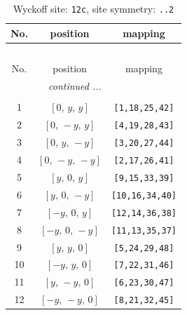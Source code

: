 \documentclass[fleqn,8pt]{jsarticle}
\begin{document}
\begin{longtable}{ccc}
\caption{Wyckoff site: {\tt 12c}, site symmetry: {\tt ..2}}
 \\
 \hline \hline
No. & position & mapping \\ \hline \endfirsthead

\multicolumn{2}{l}{\tablename\ \thetable{}} \\
 \hline \hline
No. & position & mapping \\ \hline \endhead

 \hline \hline
\multicolumn{2}{r}{\footnotesize\it continued ...} \\ \endfoot

 \hline \hline
\multicolumn{2}{r}{} \\ \endlastfoot

1 & $\left[ 0,\, y,\, y \right]$ & {\tt [1,18,25,42]} \\ \hline
2 & $\left[ 0,\, - y,\, y \right]$ & {\tt [4,19,28,43]} \\ \hline
3 & $\left[ 0,\, y,\, - y \right]$ & {\tt [3,20,27,44]} \\ \hline
4 & $\left[ 0,\, - y,\, - y \right]$ & {\tt [2,17,26,41]} \\ \hline
5 & $\left[ y,\, 0,\, y \right]$ & {\tt [9,15,33,39]} \\ \hline
6 & $\left[ y,\, 0,\, - y \right]$ & {\tt [10,16,34,40]} \\ \hline
7 & $\left[ - y,\, 0,\, y \right]$ & {\tt [12,14,36,38]} \\ \hline
8 & $\left[ - y,\, 0,\, - y \right]$ & {\tt [11,13,35,37]} \\ \hline
9 & $\left[ y,\, y,\, 0 \right]$ & {\tt [5,24,29,48]} \\ \hline
10 & $\left[ - y,\, y,\, 0 \right]$ & {\tt [7,22,31,46]} \\ \hline
11 & $\left[ y,\, - y,\, 0 \right]$ & {\tt [6,23,30,47]} \\ \hline
12 & $\left[ - y,\, - y,\, 0 \right]$ & {\tt [8,21,32,45]} \\
\end{longtable}
\renewcommand{\arraystretch}{1.2}
\end{document}
